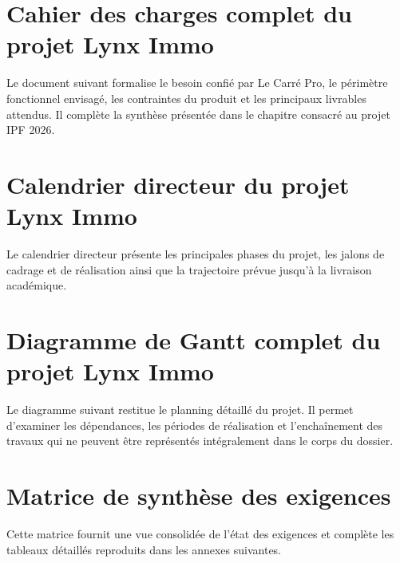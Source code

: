 
\chapter{Cahier des charges complet du projet Lynx Immo}
\label{ann:ipf-cahier-charges}

Le document suivant formalise le besoin confié par Le Carré Pro, le périmètre fonctionnel envisagé, les contraintes du produit et les principaux livrables attendus. Il complète la synthèse présentée dans le chapitre consacré au projet IPF 2026.



\chapter{Calendrier directeur du projet Lynx Immo}
\label{ann:ipf-calendrier-directeur}

Le calendrier directeur présente les principales phases du projet, les jalons de cadrage et de réalisation ainsi que la trajectoire prévue jusqu'à la livraison académique.



\chapter{Diagramme de Gantt complet du projet Lynx Immo}
\label{ann:ipf-gantt-complet}

Le diagramme suivant restitue le planning détaillé du projet. Il permet d'examiner les dépendances, les périodes de réalisation et l'enchaînement des travaux qui ne peuvent être représentés intégralement dans le corps du dossier.



\chapter{Matrice de synthèse des exigences}
\label{ann:ipf-matrice-exigences}

Cette matrice fournit une vue consolidée de l'état des exigences et complète les tableaux détaillés reproduits dans les annexes suivantes.

